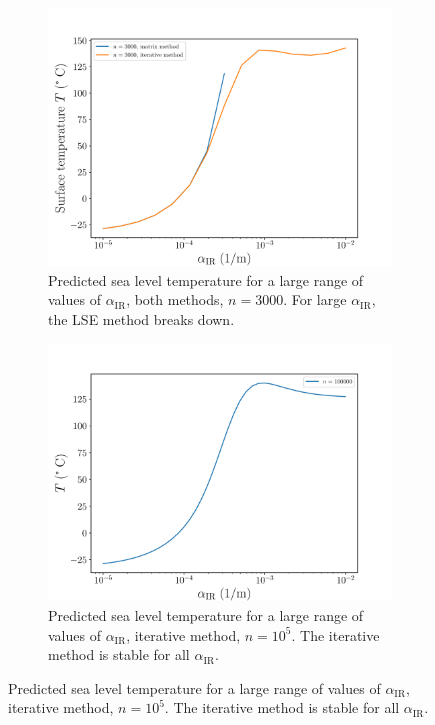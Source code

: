 \documentclass[a4paper,DIV=12,english]{scrartcl}
\begin{document}
\begin{figure}
    \centering
    \begin{subfigure}{0.49\textwidth}
        \centering
        \includegraphics[width=\textwidth]{../plots/temp_comp/full_alpha_comp.pdf}
        \caption{Predicted sea level temperature for a large range of values of $\alpha_{\text{IR}}$, both methods, $n=3000$. For large $\alpha_{\text{IR}}$, the LSE method breaks down.}
        \label{subfig:alpha_comp}
    \end{subfigure}\begin{subfigure}{0.49\textwidth}
        \centering
        \includegraphics[width=\textwidth]{../plots/temp_full_it/full_alpha.pdf}
        \caption{Predicted sea level temperature for a large range of values of $\alpha_{\text{IR}}$, iterative method, $n=10^5$. The iterative method is stable for all $\alpha_{\text{IR}}$.}

\end{subfigure}
\end{figure}
\end{document}
